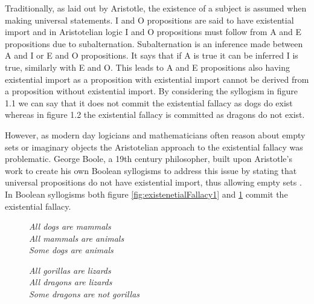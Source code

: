 \documentclass[12pt,a4paper]{report}
\newenvironment{tightcenter}{%
  \setlength\topsep{0pt}
  \setlength\parskip{0pt}
  \begin{center}
}{%
  \end{center}
}
\begin{document}
Traditionally, as laid out by Aristotle, the existence of a subject is assumed when making universal statements. I and O propositions are said to have existential import and in Aristotelian logic I and O propositions must follow from A and E propositions due to subalternation. Subalternation is an inference made between A and I or E and O propositions. It says that if A is true it can be inferred I is true, similarly with E and O. This leads to A and E propositions also having existential import as a proposition with existential import cannot be derived from a proposition without existential import.
By considering the syllogism in figure 1.1 we can say that it does not commit the existential fallacy as dogs do exist whereas in figure 1.2 the existential fallacy is committed as dragons do not exist. 

However, as modern day logicians and mathematicians often reason about empty sets or imaginary objects the Aristotelian approach to the existential fallacy was problematic. George Boole, a 19th century philosopher, built upon Aristotle's work to create his own Boolean syllogisms to address this issue by stating that universal propositions do not have existential import, thus allowing empty sets \citep{hammerhill}. In Boolean syllogisms both figure \ref{fig:existenetialFallacy1} and \ref{fig:existenetialFallacy2} commit the existential fallacy.


\begin{figure}[!h]
  \centering
  \begin{minipage}[b]{0.4\textwidth}
    \begin{tightcenter}
		\textit{All dogs are mammals }\\ 
		\textit{All mammals are animals}\\
		\textit{Some dogs are animals}\\
		\end{tightcenter}
		    \caption{}
		    \label{fig:existenetialFallacy1}
  \end{minipage}
  \hfill
  \begin{minipage}[b]{0.4\textwidth}
    \begin{tightcenter}
		\textit{All gorillas are lizards }\\ 
		\textit{All dragons are lizards}\\
		\textit{Some dragons are not gorillas}\\
		\end{tightcenter}
				    \caption{}
		    \label{fig:existenetialFallacy2}
  \end{minipage}
\end{figure}
\FloatBarrier
\end{document}
